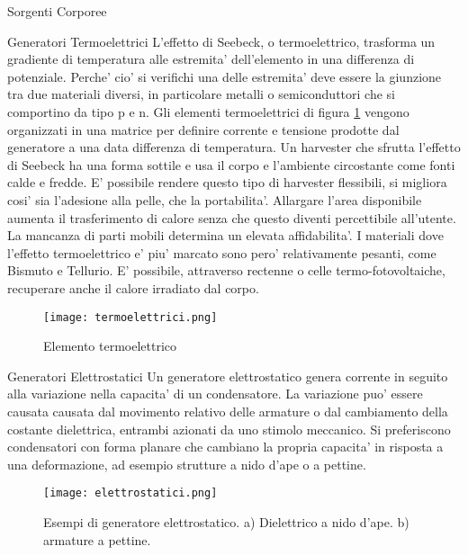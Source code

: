\begin{section}{Sorgenti Corporee}
   \begin{subsection}{Generatori Termoelettrici}
    L'effetto di Seebeck, o termoelettrico, trasforma un gradiente di temperatura alle estremita' dell'elemento in una differenza di potenziale. Perche' cio' si verifichi una delle estremita' deve essere la giunzione tra due materiali diversi, in particolare metalli o semiconduttori che si comportino da tipo p e n. Gli elementi termoelettrici di figura \ref{fig:termoelettrici} vengono organizzati in una matrice per definire corrente e tensione prodotte dal generatore a una data differenza di temperatura. Un harvester che sfrutta l'effetto di Seebeck ha una forma sottile e usa il corpo e l'ambiente circostante come fonti calde e fredde. E' possibile rendere questo tipo di harvester flessibili, si migliora cosi' sia l'adesione alla pelle, che la portabilita'. Allargare l'area disponibile aumenta il trasferimento di calore senza che questo diventi percettibile all'utente. La mancanza di parti mobili determina un elevata affidabilita'. I materiali dove l'effetto termoelettrico e' piu' marcato sono pero' relativamente pesanti, come Bismuto e Tellurio. E' possibile, attraverso rectenne o celle termo-fotovoltaiche, recuperare anche il calore irradiato dal corpo.
    \begin{figure}[H]
        \texttt{[image: termoelettrici.png]}
        \centering
        \caption{Elemento termoelettrico}
        \label{fig:termoelettrici}
    \end{figure}
   \end{subsection}

   \begin{subsection}{Generatori Elettrostatici}
    Un generatore elettrostatico genera corrente in seguito alla variazione nella capacita' di un condensatore. La variazione puo' essere causata causata dal movimento relativo delle armature o dal cambiamento della costante dielettrica, entrambi azionati da uno stimolo meccanico. Si preferiscono condensatori con forma planare che cambiano la propria capacita' in risposta a una deformazione, ad esempio strutture a nido d'ape o a pettine.
    \begin{figure}[H]
        \texttt{[image: elettrostatici.png]}
        \centering
        \caption{Esempi di generatore elettrostatico. a) Dielettrico a nido d'ape. b) armature a pettine.}
        \label{fig:elettristatici}
    \end{figure}
   \end{subsection}


\end{section}
